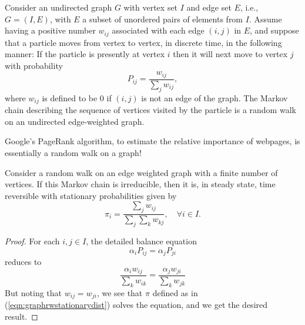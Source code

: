 \documentclass[a4paper,10pt,english]{article}
\begin{document}
\begin{shaded*}

\begin{exmp} Consider an undirected graph $G$ with vertex set $I$ and edge set $E$, i.e., $G = (I, E)$, with $E$ a subset of unordered pairs of elements from $I$. Assume having a positive number $w_{ij}$ associated with each edge $(i,j)$ in $E$, and suppose that a particle moves from vertex to vertex, in discrete time, in the following manner: If the particle is presently at vertex  $i$ then it will next move to vertex $j$ with probability
\begin{equation*}
P_{ij}=\frac{w_{ij}}{\sum_{j}w_{ij}},
\end{equation*}
where $w_{ij}$ is defined to be 0 if $(i,j)$ is not an edge of the graph. The Markov chain describing the sequence of vertices visited by the particle is a random walk on an undirected edge-weighted graph. 
\end{exmp}
\begin{note}
Google's PageRank algorithm, to estimate the relative importance of webpages, is essentially a random walk on a graph!
\end{note}

\end{shaded*}

\begin{prop}
Consider a random walk on an edge weighted graph with a finite number of vertices. If this Markov chain is irreducible, then it is, in steady state, time reversible with stationary probabilities given by 
\begin{equation}
\label{eqn:graphrwstationarydist}
\pi_i = \frac{\sum_{j}w_{ij}}{\sum_{j}\sum_{k}w_{kj}}, \quad \forall i \in I.
\end{equation}
\end{prop}
\begin{proof}
For each $i, j \in I$, the detailed balance equation
\begin{equation*}
\alpha_iP_{ij}=\alpha_{j}P_{ji}
\end{equation*}
reduces to 
\begin{equation*}
 \frac{\alpha_i w_{ij}}{\sum_{k}w_{ik}}=\frac{\alpha_j w_{ji}}{\sum_{k}w_{jk}}
\end{equation*}
But noting that $w_{ij}=w_{ji}$, we see that $\pi$ defined as in (\ref{eqn:graphrwstationarydist}) solves the equation, and we get the desired result.
\end{proof}
\end{document}
